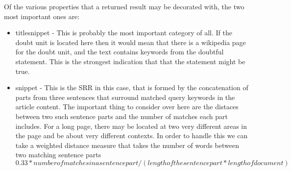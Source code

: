 \documentclass[12pt]{article}
\begin{document}
Of the various properties that a returned result may be decorated with, the two most important ones are:
\begin{itemize}
\item titlesnippet - This is probably the most important category of all. If the doubt unit is located here then it would mean that there is a wikipedia page for the doubt unit, and the text contains keywords from the doubtful statement. This is the strongest indication that that the statement might be true.
\item snippet - This is the SRR in this case, that is formed by the concatenation of parts from three sentences that surround matched query keywords in the article content. The important thing to consider over here are the distaces between two such sentence parts and the number of matches each part includes. For a long page, there may be located at two very different areas in the page and be about very different contexts. In order to handle this we can take a weighted distance measure that takes the number of words between two matching sentence parts $0.33*number of matches in a sentence part/(length of the sentence part*length of document)$

\end{itemize}
\end{document}
